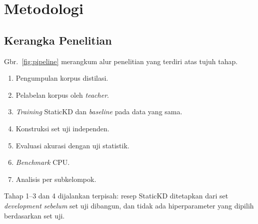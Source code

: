 \documentclass[journal]{IEEEtran}
\newcommand{\eng}[1]{\textit{#1}}   %
\begin{document}
\section{Metodologi}
\label{sec:method}

\subsection{Kerangka Penelitian}
Gbr.~\ref{fig:pipeline} merangkum alur penelitian yang terdiri atas tujuh tahap.
\begin{enumerate}
  \item Pengumpulan korpus distilasi.
  \item Pelabelan korpus oleh \eng{teacher}.
  \item \eng{Training} StaticKD dan \eng{baseline} pada data yang sama.
  \item Konstruksi set uji independen.
  \item Evaluasi akurasi dengan uji statistik.
  \item \eng{Benchmark} CPU.
  \item Analisis per subkelompok.
\end{enumerate}
Tahap 1--3 dan 4 dijalankan terpisah: resep StaticKD ditetapkan dari set \eng{development} \emph{sebelum} set uji dibangun, dan tidak ada hiperparameter yang dipilih berdasarkan set uji.
\end{document}
